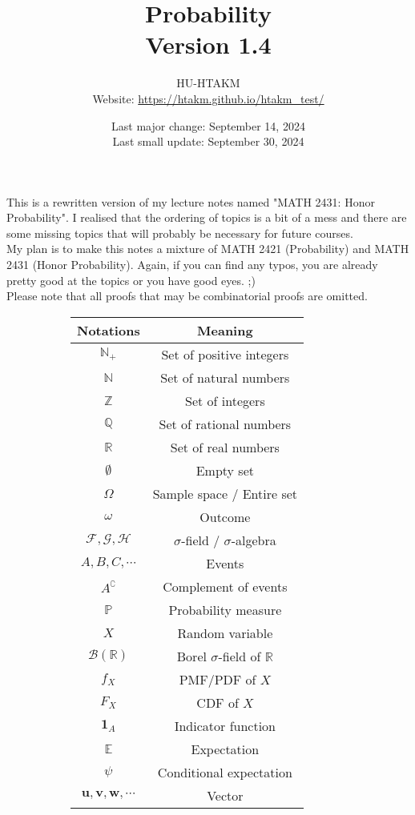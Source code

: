 \documentclass{huhtakm-template-book}
\title{
	\Huge Probability\\
	\small Version 1.4
}
\author{
	HU-HTAKM\\
	\small Website: \url{https://htakm.github.io/htakm_test/}
}
\date{
	Last major change: September 14, 2024\\
	Last small update: September 30, 2024
}
\newcommand{\prob}{\mathbb{P}}
\begin{document}
\maketitle
This is a rewritten version of my lecture notes named "MATH 2431: Honor Probability". I realised that the ordering of topics is a bit of a mess and there are some missing topics that will probably be necessary for future courses.\\
My plan is to make this notes a mixture of MATH 2421 (Probability) and MATH 2431 (Honor Probability). Again, if you can find any typos, you are already pretty good at the topics or you have good eyes. ;)\\
Please note that all proofs that may be combinatorial proofs are omitted.
\begin{figure}[h]
	\begin{subfigure}{0.45\textwidth}
		\centering
		\begin{tabular}{cc}
			Notations & Meaning\\
			\hline
			$\mathbb{N}_{+}$ & Set of positive integers\\
			$\mathbb{N}$ & Set of natural numbers\\
			$\mathbb{Z}$ & Set of integers\\
			$\mathbb{Q}$ & Set of rational numbers\\
			$\mathbb{R}$ & Set of real numbers\\
			$\emptyset$ & Empty set\\
			$\Omega$ & Sample space / Entire set\\
			$\omega$ & Outcome\\
			$\mathcal{F},\mathcal{G},\mathcal{H}$ & $\sigma$-field / $\sigma$-algebra\\
			$A,B,C,\cdots$ & Events\\
			$A^{\complement}$ & Complement of events\\
			$\prob$ & Probability measure\\
			$X$ & Random variable\\
			$\mathcal{B}(\mathbb{R})$ & Borel $\sigma$-field of $\mathbb{R}$ \\
			$f_{X}$ & PMF/PDF of $X$\\
			$F_{X}$ & CDF of $X$\\
			$\mathbf{1}_{A}$ & Indicator function\\
			$\mathbb{E}$ & Expectation\\
			$\psi$ & Conditional expectation\\
			$\mathbf{u},\mathbf{v},\mathbf{w},\cdots$ & Vector\\

\end{tabular}
\end{subfigure}
\end{figure}
\end{document}
